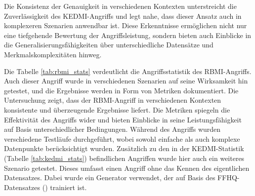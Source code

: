 Die Konsistenz der Genauigkeit in verschiedenen Kontexten unterstreicht die Zuverlässigkeit des \glqq KEDMI\grqq-Angriffs und legt nahe, dass dieser Ansatz auch in komplexeren Szenarien anwendbar ist. Diese Erkenntnisse ermöglichen nicht nur eine tiefgehende Bewertung der Angriffsleistung, sondern bieten auch Einblicke in die Generalisierungsfähigkeiten über unterschiedliche Datensätze und Merkmalskomplexitäten hinweg.
\begin{table}[h]
	\centering
	\renewcommand{\arraystretch}{1.5}
	\caption{\glqq RBMI\grqq-Angriffsstatistik}
	\label{tab:rbmi_stats}
\end{table}

Die Tabelle \ref{tab:rbmi_stats} verdeutlicht die Angriffsstatistik des \glqq RBMI\grqq-Angriffs. Auch dieser Angriff wurde in verschiedenen Szenarien auf seine Wirksamkeit hin getestet, und die Ergebnisse werden in Form von Metriken dokumentiert. Die Untersuchung zeigt, dass der \glqq RBMI\grqq-Angriff in verschiedenen Kontexten konsistente und überzeugende Ergebnisse liefert. Die Metriken spiegeln die Effektivität des Angriffs wider und bieten Einblicke in seine Leistungsfähigkeit auf Basis unterschiedlicher Bedingungen. Während des Angriffs wurden verschiedene Testläufe durchgeführt, wobei sowohl einfache als auch komplexe Datenpunkte berücksichtigt wurden. Zusätzlich zu den in der \glqq KEDMI\grqq-Statistik (Tabelle \ref{tab:kedmi_stats}) befindlichen Angriffen wurde hier auch ein weiteres Szenario getestet. Dieses umfasst einen Angriff ohne das Kennen des eigentlichen Datensatzes. Dabei wurde ein Generator verwendet, der auf Basis des FFHQ-Datensatzes (\cite{noauthor_nvlabsffhq-dataset_2023})  trainiert ist. 

